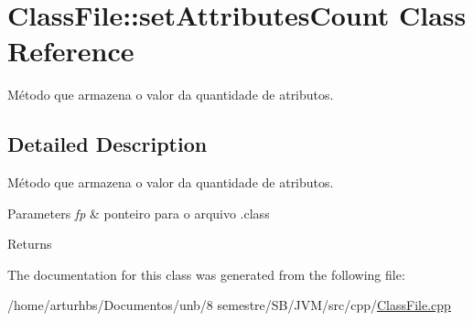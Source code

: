 \hypertarget{classClassFile_1_1setAttributesCount}{}\section{Class\+File\+:\+:set\+Attributes\+Count Class Reference}
\label{classClassFile_1_1setAttributesCount}


Método que armazena o valor da quantidade de atributos.  




\subsection{Detailed Description}
Método que armazena o valor da quantidade de atributos. 


\begin{DoxyParams}{Parameters}
{\em fp} & ponteiro para o arquivo .class \\
\hline
\end{DoxyParams}
\begin{DoxyReturn}{Returns}

\end{DoxyReturn}


The documentation for this class was generated from the following file\+:\begin{DoxyCompactItemize}
\item 
/home/arturhbs/\+Documentos/unb/8 semestre/\+S\+B/\+J\+V\+M/src/cpp/\hyperlink{ClassFile_8cpp}{Class\+File.\+cpp}\end{DoxyCompactItemize}
